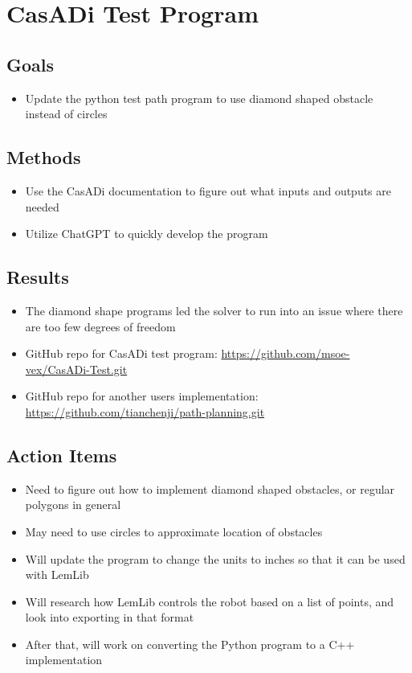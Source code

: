 \section{CasADi Test Program}

\subsection{Goals}
\begin{itemize}
    \item Update the python test path program to use diamond shaped obstacle instead of circles
\end{itemize}

\subsection{Methods}
\begin{itemize}
    \item Use the CasADi documentation to figure out what inputs and outputs are needed
    \item Utilize ChatGPT to quickly develop the program
\end{itemize}

\subsection{Results}
\begin{itemize}
    \item The diamond shape programs led the solver to run into an issue where there are too few degrees of freedom
    \item GitHub repo for CasADi test program: \href{https://github.com/msoe-vex/CasADi-Test.git}{https://github.com/msoe-vex/CasADi-Test.git}
    \item GitHub repo for another users implementation: \href{https://github.com/tianchenji/path-planning.git}{https://github.com/tianchenji/path-planning.git}
\end{itemize}

\subsection{Action Items}
\begin{itemize}
    \item Need to figure out how to implement diamond shaped obstacles, or regular polygons in general
    \item May need to use circles to approximate location of obstacles
    \item Will update the program to change the units to inches so that it can be used with LemLib
    \item Will research how LemLib controls the robot based on a list of points, and look into exporting in that format
    \item After that, will work on converting the Python program to a C++ implementation
\end{itemize}